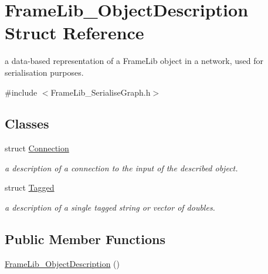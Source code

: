 \hypertarget{struct_frame_lib___object_description}{}\section{Frame\+Lib\+\_\+\+Object\+Description Struct Reference}
\label{struct_frame_lib___object_description}


a data-\/based representation of a Frame\+Lib object in a network, used for serialisation purposes.  




{\ttfamily \#include $<$Frame\+Lib\+\_\+\+Serialise\+Graph.\+h$>$}

\subsection*{Classes}
\begin{DoxyCompactItemize}
\item 
struct \hyperlink{struct_frame_lib___object_description_1_1_connection}{Connection}
\begin{DoxyCompactList}\small\item\em a description of a connection to the input of the described object. \end{DoxyCompactList}\item 
struct \hyperlink{struct_frame_lib___object_description_1_1_tagged}{Tagged}
\begin{DoxyCompactList}\small\item\em a description of a single tagged string or vector of doubles. \end{DoxyCompactList}\end{DoxyCompactItemize}
\subsection*{Public Member Functions}
\begin{DoxyCompactItemize}
\item 
\hyperlink{struct_frame_lib___object_description_a1e5fcc8625dc93572b5adc9f52ec568e}{Frame\+Lib\+\_\+\+Object\+Description} ()
\end{DoxyCompactItemize}
